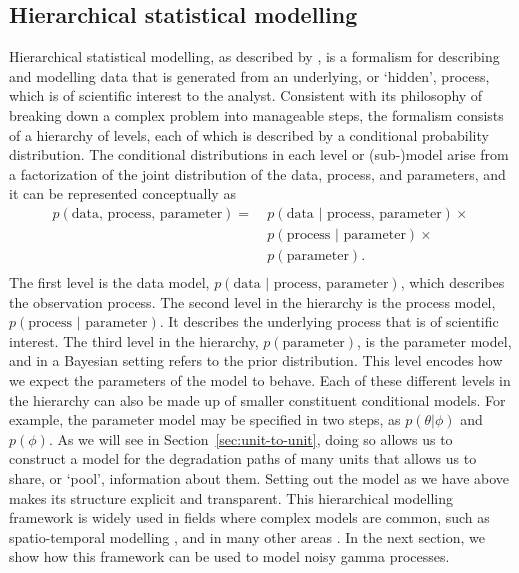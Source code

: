 \documentclass{article}
\begin{document}
\subsection{Hierarchical statistical modelling}{\label{Main_hierarhical}}

Hierarchical statistical modelling, as described by \citet{cressie_statistics_2011}, is a formalism for describing and modelling data that is generated from an underlying, or `hidden', process, which is of scientific interest to the analyst. Consistent with its philosophy of breaking down a complex problem into manageable steps, the formalism consists of a hierarchy of levels, each of which is described by a conditional probability distribution. The conditional distributions in each level or (sub-)model arise from a factorization of the joint distribution of the data, process, and parameters, and it can be represented conceptually as
\begin{align*} 
p(\mbox{data, process, parameter}) = \: & p(\mbox{data | process, parameter}) \times \\
& p(\mbox{process | parameter}) \times \\
& p(\mbox{parameter}). \\
\end{align*} 
The first level is the data model, $p(\mbox{data | process, parameter})$, which describes the observation process. The second level in the hierarchy is the process model, $p(\mbox{process | parameter})$. It describes the underlying process that is of scientific interest. The third level in the hierarchy, $p(\mbox{parameter})$, is the parameter model, and in a Bayesian setting refers to the prior distribution. This level encodes how we expect the parameters of the model to behave. Each of these different levels in the hierarchy can also be made up of smaller constituent conditional models. For example, the parameter model may be specified in two steps, as $p(\theta|\phi)$ and $p(\phi)$. As we will see in Section~\ref{sec:unit-to-unit}, doing so allows us to construct a model for the degradation paths of many units that allows us to share, or `pool', information about them.  Setting out the model as we have above makes its structure explicit and transparent. This hierarchical modelling framework is widely used in fields where complex models are common, such as spatio-temporal modelling \citep{wikle_spatio-temporal_2019}, and in many other areas \citep{gelman_bayesian_2020}. In the next section, we show how this framework can be used to model noisy gamma processes.
\end{document}
